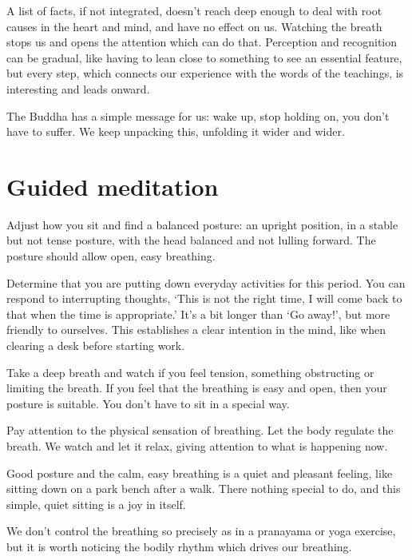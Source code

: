 A list of facts, if not integrated, doesn't reach deep enough to deal
with root causes in the heart and mind, and have no effect on us.
Watching the breath stops us and opens the attention which can do that.
Perception and recognition can be gradual, like having to lean close to
something to see an essential feature, but every step, which connects
our experience with the words of the teachings, is interesting and leads
onward.

The Buddha has a simple message for us: wake up, stop holding on, you
don't have to suffer. We keep unpacking this, unfolding it wider and
wider.

\section{Guided meditation}


\noindent
Adjust how you sit and find a balanced posture: an upright position, in
a stable but not tense posture, with the head balanced and not lulling
forward. The posture should allow open, easy breathing.

\enlargethispage*{2\baselineskip}

Determine that you are putting down everyday activities for this period.
You can respond to interrupting thoughts, `This is not the right time, I
will come back to that when the time is appropriate.' It's a bit longer
than `Go away!', but more friendly to ourselves. This establishes a
clear intention in the mind, like when clearing a desk before starting
work.

Take a deep breath and watch if you feel tension, something obstructing
or limiting the breath. If you feel that the breathing is easy and open,
then your posture is suitable. You don't have to sit in a special way.

Pay attention to the physical sensation of breathing. Let the body
regulate the breath. We watch and let it relax, giving attention to what
is happening now.

Good posture and the calm, easy breathing is a quiet and pleasant
feeling, like sitting down on a park bench after a walk. There nothing
special to do, and this simple, quiet sitting is a joy in itself.

We don't control the breathing so precisely as in a pranayama or yoga
exercise, but it is worth noticing the bodily rhythm which drives our
breathing.

